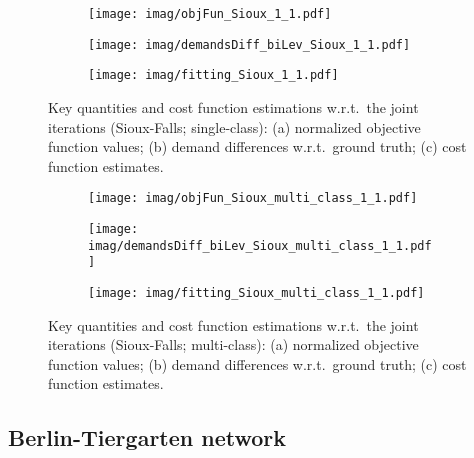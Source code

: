 \documentclass[3p]{elsarticle}
\begin{document}
\begin{figure}[H]  
	\centering
	\begin{subfigure}[b]{0.8\textwidth}
		\texttt{[image: imag/objFun\_Sioux\_1\_1.pdf]}
		\caption{}
		\label{fig:uni_objFun_Sioux}
	\end{subfigure} 
	\begin{subfigure}[b]{0.8\textwidth}
		\texttt{[image: imag/demandsDiff\_biLev\_Sioux\_1\_1.pdf]}
		\caption{}
		\label{fig:uni_demandsDiff_biLev_Sioux}
	\end{subfigure}   
	\begin{subfigure}[b]{0.8\textwidth}
		\texttt{[image: imag/fitting\_Sioux\_1\_1.pdf]}
		\caption{}
		\label{fig:uni_CostSioux}
	\end{subfigure}  
	\caption{Key quantities and cost function estimations w.r.t.\
          the joint iterations (Sioux-Falls; single-class): (a)
          normalized objective function values; (b) demand differences
          w.r.t.\ ground truth; (c) cost function estimates.}
	\label{fig:uni_Sioux}
\end{figure}
	
\begin{figure}[H]  
	\centering
	\begin{subfigure}[b]{0.8\textwidth}
		\texttt{[image: imag/objFun\_Sioux\_multi\_class\_1\_1.pdf]}
		\caption{}
		\label{objFun_Sioux}
	\end{subfigure} 
	\begin{subfigure}[b]{0.8\textwidth}
		\texttt{[image: imag/demandsDiff\_biLev\_Sioux\_multi\_class\_1\_1.pdf]}
		\caption{}
		\label{demandsDiff_biLev_Sioux}
	\end{subfigure}   
	\begin{subfigure}[b]{0.8\textwidth}
		\texttt{[image: imag/fitting\_Sioux\_multi\_class\_1\_1.pdf]}
		\caption{}
		\label{fig:CostSioux}
	\end{subfigure}  
	\caption{Key quantities and cost function estimations w.r.t.\
          the joint iterations (Sioux-Falls; multi-class): (a)
          normalized objective function values; (b) demand differences
          w.r.t.\ ground truth; (c) cost function estimates.}
	\label{fig:Sioux}
\end{figure}
	
	
\subsection{Berlin-Tiergarten network}
\end{document}
